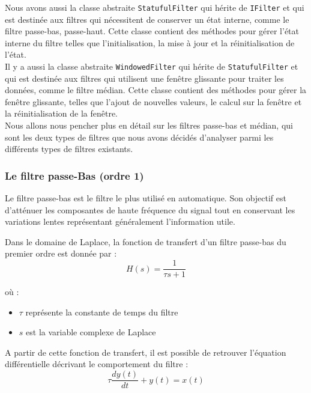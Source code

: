 Nous avons aussi la classe abstraite \texttt{StatufulFilter} qui hérite de \texttt{IFilter} et qui est destinée 
aux filtres qui nécessitent de conserver un état interne, comme le filtre passe-bas, passe-haut. 
Cette classe contient des méthodes pour gérer l'état interne du filtre telles que l'initialisation, la mise à jour 
et la réinitialisation de l'état. \\

Il y a aussi la classe abstraite \texttt{WindowedFilter} qui hérite de \texttt{StatufulFilter} et qui est destinée 
aux filtres qui utilisent une fenêtre glissante pour traiter les données, comme le filtre médian. 
Cette classe contient des méthodes pour gérer la fenêtre glissante, telles que l'ajout de nouvelles valeurs, le
calcul sur la fenêtre et la réinitialisation de la fenêtre. \\

Nous allons nous pencher plus en détail sur les filtres passe-bas et médian, qui sont les deux types de filtres que nous avons décidés d'analyser 
parmi les différents types de filtres existants.

\subsubsection{Le filtre passe-Bas (ordre 1)}
\label{sec:filtre_passe_bas}

Le filtre passe-bas est le filtre le plus utilisé en automatique. Son objectif est d'atténuer les composantes de haute fréquence du signal tout en conservant les variations lentes représentant généralement l'information utile.

Dans le domaine de Laplace, la fonction de transfert d'un filtre passe-bas du premier ordre est donnée par :
\begin{equation}
    H(s) = \frac{1}{\tau s + 1}
\end{equation}

où : 
\begin{itemize}
    \item $\tau$ représente la constante de temps du filtre
    \item $s$ est la variable complexe de Laplace
\end{itemize}

A partir de cette fonction de transfert, il est possible de retrouver l'équation différentielle décrivant le comportement du filtre :
\begin{equation}
    \tau \frac{dy(t)}{dt} + y(t) = x(t)
\end{equation}

